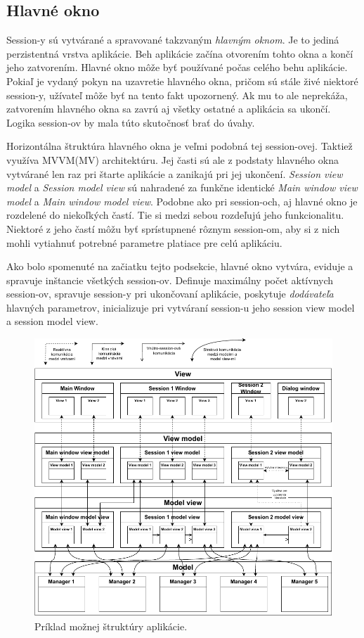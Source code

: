 \subsection{Hlavné okno}\label{Hlavne_okno_obecne}

Session-y sú vytvárané a spravované takzvaným \textit{hlavným oknom}. Je to jediná perzistentná  vrstva aplikácie. Beh aplikácie začína otvorením tohto okna a končí jeho zatvorením. Hlavné okno môže byť používané počas celého behu aplikácie. Pokiaľ je vydaný pokyn na uzavretie hlavného okna, pričom sú stále živé niektoré session-y, užívateľ môže byť na tento fakt upozornený. Ak mu to ale neprekáža, zatvorením hlavného okna sa zavrú aj všetky ostatné a aplikácia sa ukončí. Logika session-ov by mala túto skutočnosť brať do úvahy.

Horizontálna štruktúra hlavného okna je veľmi podobná tej session-ovej. Taktiež využíva MVVM(MV) architektúru. Jej časti sú ale z podstaty hlavného okna vytvárané len raz pri štarte aplikácie a zanikajú pri jej ukončení. \textit{Session view model} a \textit{Session model view} sú nahradené za funkčne identické \textit{Main window view model} a \textit{Main window model view}. Podobne ako pri session-och, aj hlavné okno je rozdelené do niekoľkých častí. Tie si medzi sebou rozdeľujú jeho funkcionalitu. Niektoré z jeho častí môžu byť sprístupnené rôznym session-om, aby si z nich mohli vytiahnuť potrebné parametre platiace pre celú aplikáciu.     

Ako bolo spomenuté na začiatku tejto podsekcie, hlavné okno vytvára, eviduje a spravuje inštancie všetkých session-ov. Definuje maximálny počet aktívnych session-ov, spravuje session-y pri ukončovaní aplikácie, poskytuje \textit{dodávateľa} hlavných parametrov, inicializuje pri vytváraní session-u jeho session view model a session model view.  

\begin{figure}[p]\centering
\includegraphics[]{img/priklad_struktury}
\caption{Príklad možnej  štruktúry aplikácie.} 
\label{obr02:priklad_struktury}
\end{figure}
